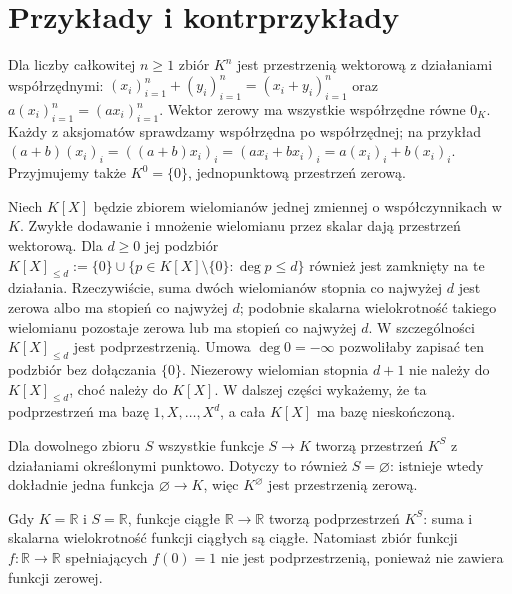 \section{Przykłady i kontrprzykłady}
\label{sec:lin-przyklady-przestrzeni}

\begin{przyklad}
\label{prz:lin-kn}
Dla liczby całkowitej \(n\geq1\) zbiór \(K^n\) jest przestrzenią
wektorową z działaniami współrzędnymi:
\((x_i)_{i=1}^n+(y_i)_{i=1}^n=(x_i+y_i)_{i=1}^n\) oraz
\(a(x_i)_{i=1}^n=(ax_i)_{i=1}^n\).
Wektor zerowy ma wszystkie współrzędne równe \(0_K\).
Każdy z aksjomatów sprawdzamy współrzędna po współrzędnej;
na przykład \((a+b)(x_i)_i=((a+b)x_i)_i
=(ax_i+bx_i)_i=a(x_i)_i+b(x_i)_i\).
Przyjmujemy także \(K^0=\{0\}\), jednopunktową przestrzeń zerową.
\end{przyklad}

\begin{przyklad}[Wielomiany]
\label{prz:lin-wielomiany}
Niech \(K[X]\) będzie zbiorem wielomianów jednej zmiennej
o współczynnikach w \(K\). Zwykłe dodawanie i mnożenie
wielomianu przez skalar dają przestrzeń wektorową.
Dla \(d\geq0\) jej podzbiór
\(K[X]_{\leq d}:=\{0\}\cup
\{p\in K[X]\setminus\{0\}:\deg p\leq d\}\)
również jest zamknięty na te działania.
Rzeczywiście, suma dwóch wielomianów
stopnia co najwyżej \(d\) jest zerowa
albo ma stopień co najwyżej \(d\);
podobnie skalarna wielokrotność takiego
wielomianu pozostaje zerowa lub ma
stopień co najwyżej \(d\).
W szczególności \(K[X]_{\leq d}\) jest podprzestrzenią.
Umowa \(\deg0=-\infty\) pozwoliłaby zapisać ten podzbiór
bez dołączania \(\{0\}\).
Niezerowy wielomian stopnia \(d+1\) nie należy do
\(K[X]_{\leq d}\), choć należy do \(K[X]\).
W dalszej części wykażemy, że ta podprzestrzeń ma bazę
\(1,X,\ldots,X^d\), a cała \(K[X]\) ma bazę nieskończoną.
\end{przyklad}

\begin{przyklad}
\label{prz:lin-funkcje}
Dla dowolnego zbioru \(S\) wszystkie funkcje \(S\to K\)
tworzą przestrzeń \(K^S\) z działaniami określonymi punktowo.
Dotyczy to również \(S=\varnothing\): istnieje wtedy
dokładnie jedna funkcja \(\varnothing\to K\), więc
\(K^\varnothing\) jest przestrzenią zerową.

Gdy \(K=\mathbb R\) i \(S=\mathbb R\), funkcje ciągłe
\(\mathbb R\to\mathbb R\) tworzą podprzestrzeń \(K^S\):
suma i skalarna wielokrotność funkcji ciągłych są ciągłe.
Natomiast zbiór funkcji \(f\colon\mathbb R\to\mathbb R\)
spełniających \(f(0)=1\) nie jest podprzestrzenią,
ponieważ nie zawiera funkcji zerowej.
\end{przyklad}

